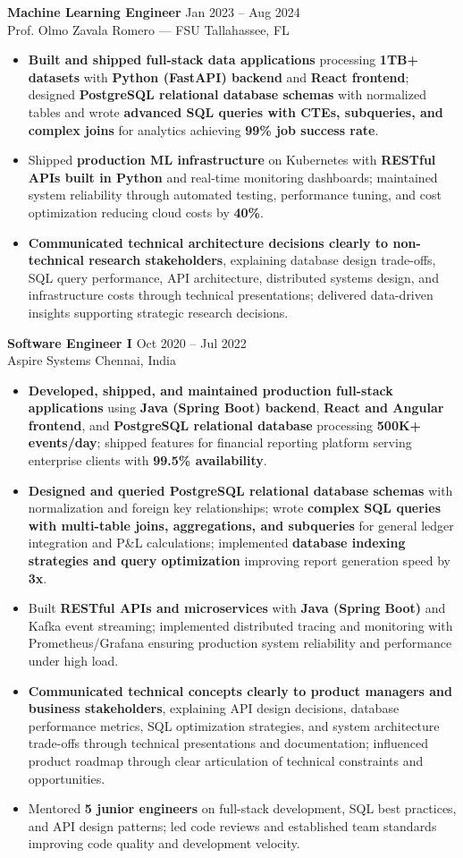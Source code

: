 \documentclass[letterpaper,10pt]{article}
\newcommand{\resumeItem}[1]{\item\small #1}
\newcommand{\resumeSubheading}[4]{
  \vspace{6pt}
  \noindent
  \textbf{#1} \hfill {\footnotesize #2} \\
  [-1pt]
  \noindent
  \small #3 \hfill {\small #4}
  \vspace{3pt}
}
\newcommand{\resumeItemsStart}{\vspace{-2pt}\begin{itemize}}
\newcommand{\resumeItemsEnd}{\end{itemize}\vspace{6pt}}
\begin{document}
\resumeSubheading
{Machine Learning Engineer}{Jan 2023 -- Aug 2024}
{Prof. Olmo Zavala Romero — FSU}{Tallahassee, FL}
\resumeItemsStart
\resumeItem{\textbf{Built and shipped full-stack data applications} processing \textbf{1TB+ datasets} with \textbf{Python (FastAPI) backend} and \textbf{React frontend}; designed \textbf{PostgreSQL relational database schemas} with normalized tables and wrote \textbf{advanced SQL queries with CTEs, subqueries, and complex joins} for analytics achieving \textbf{99\% job success rate}.}
\resumeItem{Shipped \textbf{production ML infrastructure} on Kubernetes with \textbf{RESTful APIs built in Python} and real-time monitoring dashboards; maintained system reliability through automated testing, performance tuning, and cost optimization reducing cloud costs by \textbf{40\%}.}
\resumeItem{\textbf{Communicated technical architecture decisions clearly to non-technical research stakeholders}, explaining database design trade-offs, SQL query performance, API architecture, distributed systems design, and infrastructure costs through technical presentations; delivered data-driven insights supporting strategic research decisions.}
\resumeItemsEnd
\vspace{-12pt}

\resumeSubheading
{Software Engineer I}{Oct 2020 -- Jul 2022}
{Aspire Systems}{Chennai, India}
\resumeItemsStart
\resumeItem{\textbf{Developed, shipped, and maintained production full-stack applications} using \textbf{Java (Spring Boot) backend}, \textbf{React and Angular frontend}, and \textbf{PostgreSQL relational database} processing \textbf{500K+ events/day}; shipped features for financial reporting platform serving enterprise clients with \textbf{99.5\% availability}.}
\resumeItem{\textbf{Designed and queried PostgreSQL relational database schemas} with normalization and foreign key relationships; wrote \textbf{complex SQL queries with multi-table joins, aggregations, and subqueries} for general ledger integration and P\&L calculations; implemented \textbf{database indexing strategies and query optimization} improving report generation speed by \textbf{3x}.}
\resumeItem{Built \textbf{RESTful APIs and microservices} with \textbf{Java (Spring Boot)} and Kafka event streaming; implemented distributed tracing and monitoring with Prometheus/Grafana ensuring production system reliability and performance under high load.}
\resumeItem{\textbf{Communicated technical concepts clearly to product managers and business stakeholders}, explaining API design decisions, database performance metrics, SQL optimization strategies, and system architecture trade-offs through technical presentations and documentation; influenced product roadmap through clear articulation of technical constraints and opportunities.}
\resumeItem{Mentored \textbf{5 junior engineers} on full-stack development, SQL best practices, and API design patterns; led code reviews and established team standards improving code quality and development velocity.}
\resumeItemsEnd
\vspace{-12pt}
\end{document}

